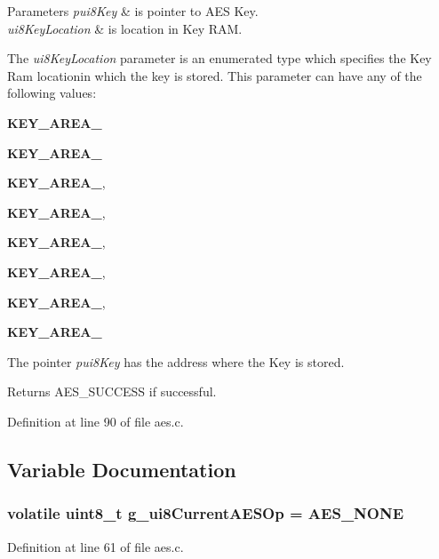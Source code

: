 \begin{DoxyParams}{Parameters}
{\em pui8\+Key} & is pointer to A\+ES Key. \\
\hline
{\em ui8\+Key\+Location} & is location in Key R\+AM.\\
\hline
\end{DoxyParams}
The {\itshape ui8\+Key\+Location} parameter is an enumerated type which specifies the Key Ram locationin which the key is stored. This parameter can have any of the following values\+:


\begin{DoxyItemize}
\item {\bfseries K\+E\+Y\+\_\+\+A\+R\+E\+A\+\_} 
\item {\bfseries K\+E\+Y\+\_\+\+A\+R\+E\+A\+\_} 
\item {\bfseries K\+E\+Y\+\_\+\+A\+R\+E\+A\+\_},
\item {\bfseries K\+E\+Y\+\_\+\+A\+R\+E\+A\+\_},
\item {\bfseries K\+E\+Y\+\_\+\+A\+R\+E\+A\+\_},
\item {\bfseries K\+E\+Y\+\_\+\+A\+R\+E\+A\+\_},
\item {\bfseries K\+E\+Y\+\_\+\+A\+R\+E\+A\+\_},
\item {\bfseries K\+E\+Y\+\_\+\+A\+R\+E\+A\+\_} 
\end{DoxyItemize}

The pointer {\itshape pui8\+Key} has the address where the Key is stored.

\begin{DoxyReturn}{Returns}
A\+E\+S\+\_\+\+S\+U\+C\+C\+E\+SS if successful. 
\end{DoxyReturn}


Definition at line 90 of file aes.\+c.



\subsection{Variable Documentation}
\subsubsection[{\texorpdfstring{g\+\_\+ui8\+Current\+A\+E\+S\+Op}{g_ui8CurrentAESOp}}]{\setlength{\rightskip}{0pt plus 5cm}volatile {\bf uint8\+\_\+t} g\+\_\+ui8\+Current\+A\+E\+S\+Op = {\bf A\+E\+S\+\_\+\+N\+O\+NE}}\hypertarget{group__aes__api_gac6e2e88301a26d4365ebe265896148d2}{}\label{group__aes__api_gac6e2e88301a26d4365ebe265896148d2}


Definition at line 61 of file aes.\+c.

